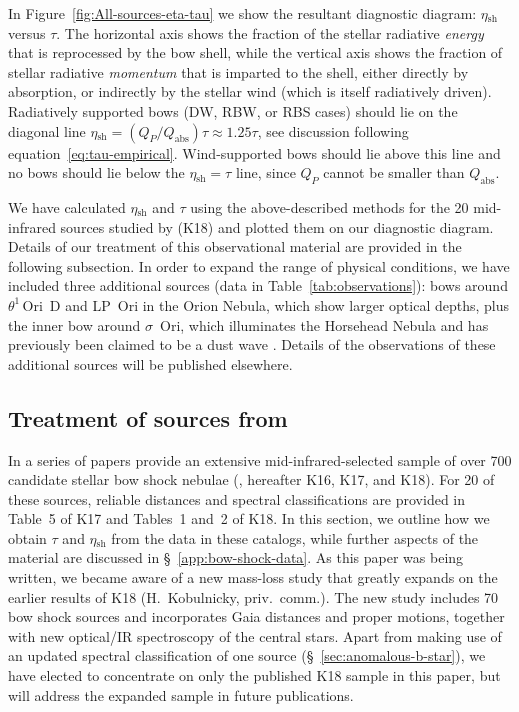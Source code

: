 \documentclass[useAMS, usenatbib, a4paper]{mnras}
\newcommand{\thD}{\(\theta^1\)\,Ori~D}
\newcommand\shell{\ensuremath{_{\text{sh}}}}
\begin{document}
In Figure~\ref{fig:All-sources-eta-tau} we show the resultant
diagnostic diagram: \(\eta\shell\) versus \(\tau\).  The horizontal axis
shows the fraction of the stellar radiative \emph{energy} that is
reprocessed by the bow shell, while the vertical axis shows the
fraction of stellar radiative \emph{momentum} that is imparted to the
shell, either directly by absorption, or indirectly by the stellar
wind (which is itself radiatively driven).  Radiatively supported bows
(DW, RBW, or RBS cases) should lie on the diagonal line
\(\eta\shell = ( Q_P / Q_{\text{abs}}) \tau \approx 1.25 \tau\), see discussion
following equation~\eqref{eq:tau-empirical}.  Wind-supported bows
should lie above this line and no bows should lie below the
\(\eta\shell = \tau\) line, since \(Q_P\) cannot be smaller than
\(Q_{\text{abs}}\).

We have calculated \(\eta\shell\) and \(\tau\) using the above-described
methods for the 20 mid-infrared sources studied by
\citet{Kobulnicky:2018a} (K18) and plotted them on our diagnostic
diagram.  Details of our treatment of this observational material are
provided in the following subsection.  In order to expand the range of
physical conditions, we have included three additional sources (data
in Table~\ref{tab:observations}): bows around \thD{}
\citep{Smith:2005a} and LP~Ori \citep{ODell:2001c} in the Orion
Nebula, which show larger optical depths, plus the inner bow around
\(\sigma\)~Ori, which illuminates the Horsehead Nebula and has previously
been claimed to be a dust wave \citep{Ochsendorf:2014b,
  Ochsendorf:2015a}.  Details of the observations of these additional
sources will be published elsewhere.


\subsection{Treatment of sources from \citeauthor{Kobulnicky:2018a}}
\label{sec:kobulnicky}

In a series of papers \citeauthor{Kobulnicky:2018a} provide an
extensive mid-infrared-selected sample of over 700 candidate stellar
bow shock nebulae (\citealp{Kobulnicky:2016a, Kobulnicky:2017a,
  Kobulnicky:2018a}, hereafter K16, K17, and K18).  For 20 of these
sources, reliable distances and spectral classifications are provided
in Table~5 of K17 and Tables~1 and~2 of K18. In this section, we
outline how we obtain \(\tau\) and \(\eta\shell\) from the data in
these catalogs, while further aspects of the
\citeauthor{Kobulnicky:2018a} material are discussed in
\S~\ref{app:bow-shock-data}.  As this paper was being written, we
became aware of a new mass-loss study that greatly expands on the
earlier results of K18 (H.~Kobulnicky, priv.~comm.).  The new study
includes 70 bow shock sources and incorporates Gaia distances and
proper motions, together with new optical/IR spectroscopy of the
central stars.  Apart from making use of an updated spectral
classification of one source (\S~\ref{sec:anomalous-b-star}), we have
elected to concentrate on only the published K18 sample in this paper,
but will address the expanded sample in future publications.
\end{document}
